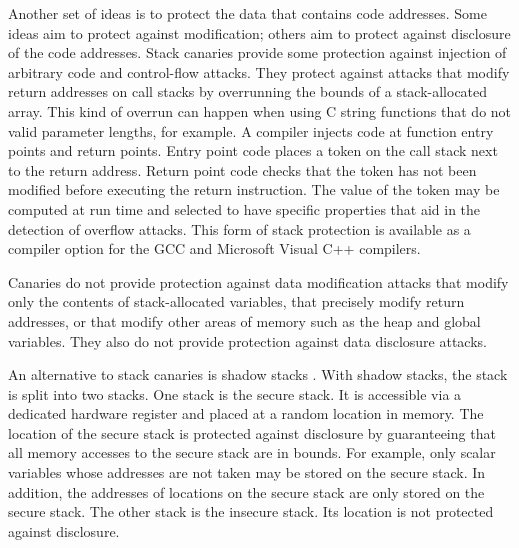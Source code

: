Another set of ideas is to protect the data that contains 
code addresses.  Some ideas aim to protect against modification;
others aim to protect against disclosure of the code addresses.
Stack canaries \cite{Cowan1998, Dang2015, Petsios2015} provide 
some protection against injection of 
arbitrary code and control-flow attacks.
They protect against attacks that modify return addresses
on call stacks by overrunning the bounds of a stack-allocated array.  
This kind of overrun can happen when using C string functions that do
not valid parameter lengths, for example.   A
compiler injects code at function entry points and return
points. Entry point code places a token on the call stack
next to the return address.  Return point code checks that
the token has not been modified before executing the return
instruction.  The value of the token may be computed at run time
and selected to have specific properties that aid in the detection
of overflow attacks.  This form of stack protection is available as a
compiler option for the GCC and Microsoft Visual C++ compilers.

Canaries do not provide protection against data modification attacks
that modify only the contents of stack-allocated variables, that
precisely modify return addresses, or that modify other areas 
of memory such as the heap and global variables. They also do not
provide protection against data disclosure attacks. 

An alternative to stack canaries is shadow stacks \cite{Abadi2005, 
Baratloo2000, Bhatkar2005, Chiueh2001, Corliss2005, Erlingsson2006,
Frantzen2001, Kuznetsov2014}.
With shadow stacks,
the stack is split into two stacks.  One stack is the secure stack. It
is accessible via a dedicated hardware register and placed at a random
location in memory.   The location of the secure stack is protected
against disclosure by guaranteeing that all memory accesses
to the secure stack are in bounds.  For example, only scalar variables whose
addresses are not taken may be stored on the secure stack. In addition, 
the addresses of locations on the secure stack are only stored on the secure
stack.   The other stack is the insecure stack.  Its location is not
protected against disclosure.

